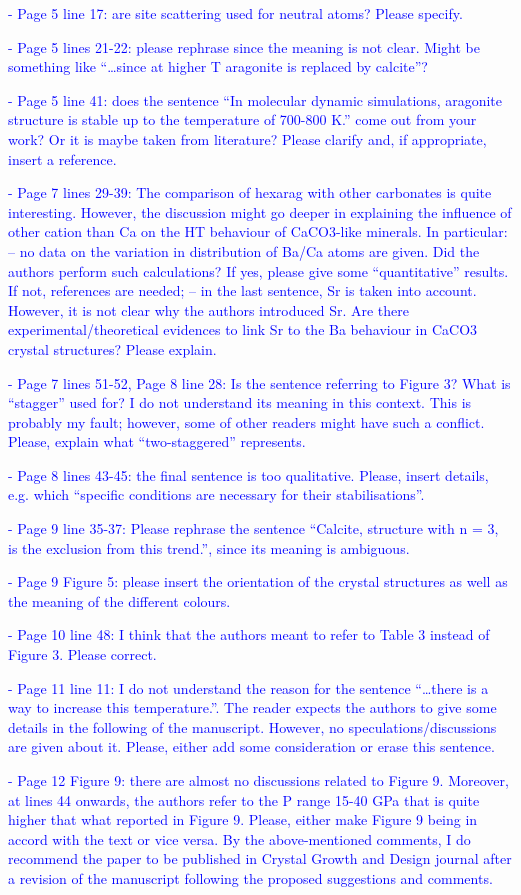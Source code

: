 \documentclass[a4paper]{article}
\begin{document}
\textcolor{blue}{
- Page 5 line 17: are site scattering used for neutral atoms? Please specify.
}

\textcolor{blue}{
- Page 5 lines 21-22: please rephrase since the meaning is not clear. Might be something like “…since at higher T aragonite is replaced by calcite”?
}

\textcolor{blue}{
- Page 5 line 41: does the sentence “In molecular dynamic simulations, aragonite structure is stable up to the temperature of 700-800 K.” come out from your work? Or it is maybe taken from literature? Please clarify and, if appropriate, insert a reference.
}

\textcolor{blue}{
- Page 7 lines 29-39: The comparison of hexarag with other carbonates is quite interesting. However, the discussion might go deeper in explaining the influence of other cation than Ca on the HT behaviour of CaCO3-like minerals. In particular:
– no data on the variation in distribution of Ba/Ca atoms are given. Did the authors perform such calculations? If yes, please give some “quantitative” results. If not, references are needed;
– in the last sentence, Sr is taken into account. However, it is not clear why the authors introduced Sr. Are there experimental/theoretical evidences to link Sr to the Ba behaviour in CaCO3 crystal structures? Please explain.
}

\textcolor{blue}{
- Page 7 lines 51-52, Page 8 line 28: Is the sentence referring to Figure 3? What is “stagger” used for? I do not understand its meaning in this context. This is probably my fault; however, some of other readers might have such a conflict. Please, explain what “two-staggered” represents.
}

\textcolor{blue}{
- Page 8 lines 43-45: the final sentence is too qualitative. Please, insert details, e.g. which “specific conditions are necessary for their stabilisations”.
}

\textcolor{blue}{
- Page 9 line 35-37: Please rephrase the sentence “Calcite, structure with n = 3, is the exclusion from this trend.”, since its meaning is ambiguous.
}

\textcolor{blue}{
- Page 9 Figure 5: please insert the orientation of the crystal structures as well as the meaning of the different colours.
}

\textcolor{blue}{
- Page 10 line 48: I think that the authors meant to refer to Table 3 instead of Figure 3. Please correct.
}

\textcolor{blue}{
- Page 11 line 11: I do not understand the reason for the sentence “…there is a way to increase this temperature.”. The reader expects the authors to give some details in the following of the manuscript. However, no speculations/discussions are given about it. Please, either add some consideration or erase this sentence.
}

\textcolor{blue}{
- Page 12 Figure 9: there are almost no discussions related to Figure 9. Moreover, at lines 44 onwards, the authors refer to the P range 15-40 GPa that is quite higher that what reported in Figure 9. Please, either make Figure 9 being in accord with the text or vice versa.
By the above-mentioned comments, I do recommend the paper to be published in Crystal Growth and Design journal after a revision of the manuscript following the proposed suggestions and comments.
}
\end{document}
